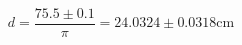 \documentclass[11pt]{article}
\begin{document}


$$d = \frac{75.5\pm0.1}{\pi} = 24.0324\pm0.0318\mathrm{ cm}$$
\end{document}
